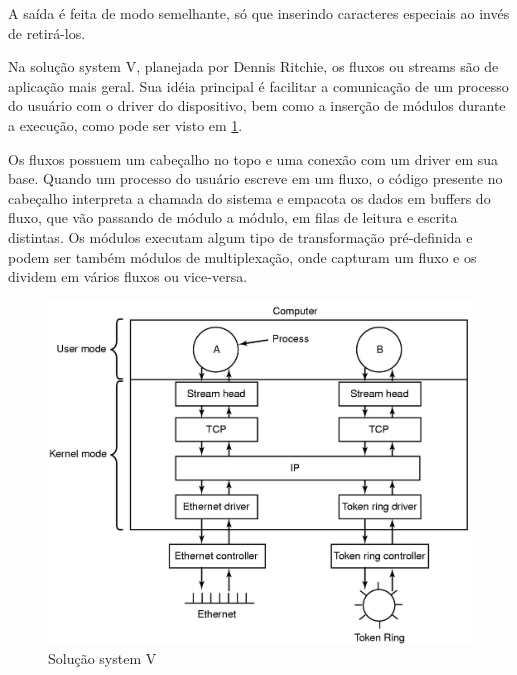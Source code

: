 A saída é feita de modo semelhante, só que inserindo caracteres especiais ao invés de retirá-los.

Na solução system V, planejada por Dennis Ritchie, os fluxos ou streams são de aplicação mais geral. Sua idéia principal é facilitar a comunicação de um processo do usuário com o driver do dispositivo, bem como a inserção de módulos durante a execução, como pode ser visto em \ref{fig:system_V}.

Os fluxos possuem um cabeçalho no topo e uma conexão com um driver em sua base. Quando um processo do usuário escreve em um fluxo, o código presente no cabeçalho interpreta a chamada do sistema e empacota os dados em buffers do fluxo, que vão passando de módulo a módulo, em filas de leitura e escrita distintas. Os módulos executam algum tipo de transformação pré-definida e podem ser também módulos de multiplexação, onde capturam um fluxo e os dividem em vários fluxos ou vice-versa.

\begin{figure}
	\caption{Solução system V}
	\label{fig:system_V}
	\includegraphics{imgs/systemVstreams.png}
\end{figure}
